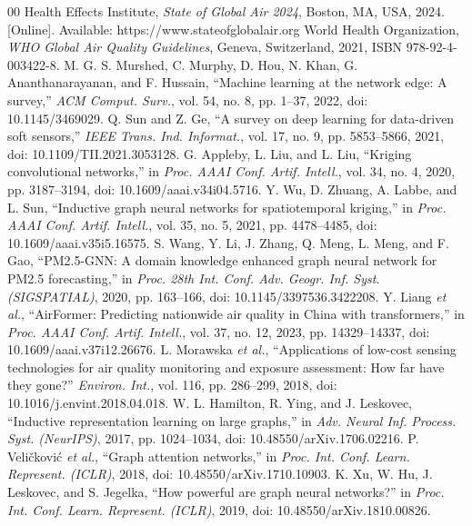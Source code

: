 \documentclass[journal]{IEEEtran}
\begin{document}
\begin{thebibliography}{00}
 Health Effects Institute, \emph{State of Global Air 2024}, Boston, MA, USA, 2024. [Online]. Available: https://www.stateofglobalair.org
 World Health Organization, \emph{WHO Global Air Quality Guidelines}, Geneva, Switzerland, 2021, ISBN 978-92-4-003422-8.
 M. G. S. Murshed, C. Murphy, D. Hou, N. Khan, G. Ananthanarayanan, and F. Hussain, ``Machine learning at the network edge: A survey,'' \emph{ACM Comput. Surv.}, vol. 54, no. 8, pp. 1--37, 2022, doi: 10.1145/3469029.
 Q. Sun and Z. Ge, ``A survey on deep learning for data-driven soft sensors,'' \emph{IEEE Trans. Ind. Informat.}, vol. 17, no. 9, pp. 5853--5866, 2021, doi: 10.1109/TII.2021.3053128.
 G. Appleby, L. Liu, and L. Liu, ``Kriging convolutional networks,'' in \emph{Proc. AAAI Conf. Artif. Intell.}, vol. 34, no. 4, 2020, pp. 3187--3194, doi: 10.1609/aaai.v34i04.5716.
 Y. Wu, D. Zhuang, A. Labbe, and L. Sun, ``Inductive graph neural networks for spatiotemporal kriging,'' in \emph{Proc. AAAI Conf. Artif. Intell.}, vol. 35, no. 5, 2021, pp. 4478--4485, doi: 10.1609/aaai.v35i5.16575.
 S. Wang, Y. Li, J. Zhang, Q. Meng, L. Meng, and F. Gao, ``PM2.5-GNN: A domain knowledge enhanced graph neural network for PM2.5 forecasting,'' in \emph{Proc. 28th Int. Conf. Adv. Geogr. Inf. Syst. (SIGSPATIAL)}, 2020, pp. 163--166, doi: 10.1145/3397536.3422208.
 Y. Liang \emph{et al.}, ``AirFormer: Predicting nationwide air quality in China with transformers,'' in \emph{Proc. AAAI Conf. Artif. Intell.}, vol. 37, no. 12, 2023, pp. 14329--14337, doi: 10.1609/aaai.v37i12.26676.
 L. Morawska \emph{et al.}, ``Applications of low-cost sensing technologies for air quality monitoring and exposure assessment: How far have they gone?'' \emph{Environ. Int.}, vol. 116, pp. 286--299, 2018, doi: 10.1016/j.envint.2018.04.018.
 W. L. Hamilton, R. Ying, and J. Leskovec, ``Inductive representation learning on large graphs,'' in \emph{Adv. Neural Inf. Process. Syst. (NeurIPS)}, 2017, pp. 1024--1034, doi: 10.48550/arXiv.1706.02216.
 P. Veli\v{c}kovi\'c \emph{et al.}, ``Graph attention networks,'' in \emph{Proc. Int. Conf. Learn. Represent. (ICLR)}, 2018, doi: 10.48550/arXiv.1710.10903.
 K. Xu, W. Hu, J. Leskovec, and S. Jegelka, ``How powerful are graph neural networks?'' in \emph{Proc. Int. Conf. Learn. Represent. (ICLR)}, 2019, doi: 10.48550/arXiv.1810.00826.

\end{thebibliography}
\end{document}
